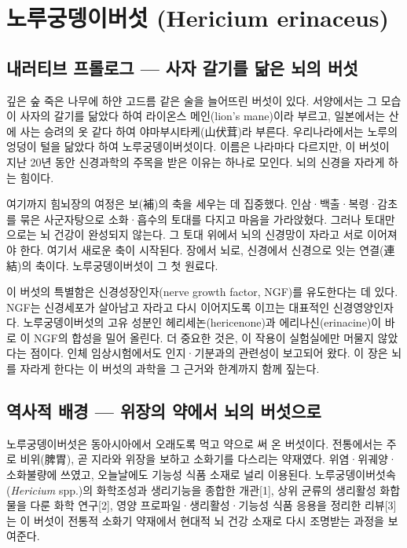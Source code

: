 \documentclass[12pt,oneside]{book}
\newcommand{\refend}{\endgroup\par}
\begin{document}
\refend


\chapter{노루궁뎅이버섯 (Hericium erinaceus)}

\section{내러티브 프롤로그 — 사자 갈기를 닮은 뇌의 버섯}

깊은 숲 죽은 나무에 하얀 고드름 같은 술을 늘어뜨린 버섯이 있다. 서양에서는 그 모습이 사자의 갈기를 닮았다 하여 라이온스 메인(lion's mane)이라 부르고, 일본에서는 산에 사는 승려의 옷 같다 하여 야마부시타케(山伏茸)라 부른다. 우리나라에서는 노루의 엉덩이 털을 닮았다 하여 노루궁뎅이버섯이다. 이름은 나라마다 다르지만, 이 버섯이 지난 20년 동안 신경과학의 주목을 받은 이유는 하나로 모인다. 뇌의 신경을 자라게 하는 힘이다.

여기까지 힘뇌장의 여정은 보(補)의 축을 세우는 데 집중했다. 인삼·백출·복령·감초를 묶은 사군자탕으로 소화·흡수의 토대를 다지고 마음을 가라앉혔다. 그러나 토대만으로는 뇌 건강이 완성되지 않는다. 그 토대 위에서 뇌의 신경망이 자라고 서로 이어져야 한다. 여기서 새로운 축이 시작된다. 장에서 뇌로, 신경에서 신경으로 잇는 연결(連結)의 축이다. 노루궁뎅이버섯이 그 첫 원료다.

이 버섯의 특별함은 신경성장인자(nerve growth factor, NGF)를 유도한다는 데 있다. NGF는 신경세포가 살아남고 자라고 다시 이어지도록 이끄는 대표적인 신경영양인자다. 노루궁뎅이버섯의 고유 성분인 헤리세논(hericenone)과 에리나신(erinacine)이 바로 이 NGF의 합성을 밀어 올린다. 더 중요한 것은, 이 작용이 실험실에만 머물지 않았다는 점이다. 인체 임상시험에서도 인지·기분과의 관련성이 보고되어 왔다. 이 장은 뇌를 자라게 한다는 이 버섯의 과학을 그 근거와 한계까지 함께 짚는다.

\section{역사적 배경 — 위장의 약에서 뇌의 버섯으로}

노루궁뎅이버섯은 동아시아에서 오래도록 먹고 약으로 써 온 버섯이다. 전통에서는 주로 비위(脾胃), 곧 지라와 위장을 보하고 소화기를 다스리는 약재였다. 위염·위궤양·소화불량에 쓰였고, 오늘날에도 기능성 식품 소재로 널리 이용된다. 노루궁뎅이버섯속(\textit{Hericium} spp.)의 화학조성과 생리기능을 종합한 개관[1], 상위 균류의 생리활성 화합물을 다룬 화학 연구[2], 영양 프로파일·생리활성·기능성 식품 응용을 정리한 리뷰[3]는 이 버섯이 전통적 소화기 약재에서 현대적 뇌 건강 소재로 다시 조명받는 과정을 보여준다.
\end{document}
